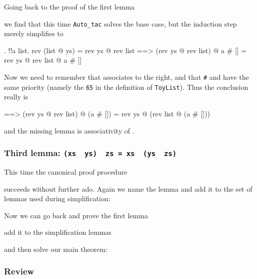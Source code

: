 Going back to the proof of the first lemma
\begin{ttbox}\makeatother
\end{ttbox}
we find that this time \texttt{Auto_tac} solves the base case, but the
induction step merely simplifies to
\begin{ttbox}\makeatother
{. !!a list.}
{\out       rev (list @ ys) = rev ys @ rev list}
{\out       ==> (rev ys @ rev list) @ a # [] = rev ys @ rev list @ a # []}
\end{ttbox}
Now we need to remember that \texttt{\at} associates to the right, and that
\texttt{\#} and \texttt{\at} have the same priority (namely the \texttt{65}
in the definition of \texttt{ToyList}). Thus the conclusion really is
\begin{ttbox}\makeatother
{\out     ==> (rev ys @ rev list) @ (a # []) = rev ys @ (rev list @ (a # []))}
\end{ttbox}
and the missing lemma is associativity of \texttt{\at}.

\subsubsection*{Third lemma: \texttt{(xs \at~ys) \at~zs = xs \at~(ys \at~zs)}}

This time the canonical proof procedure
\begin{ttbox}\makeatother
\end{ttbox}
succeeds without further ado. Again we name the lemma and add it to
the set of lemmas used during simplification:
\begin{ttbox}
\end{ttbox}
Now we can go back and prove the first lemma
\begin{ttbox}\makeatother
\end{ttbox}
add it to the simplification lemmas
\begin{ttbox}
\end{ttbox}
and then solve our main theorem:
\begin{ttbox}\makeatother
\end{ttbox}

\subsubsection*{Review}

